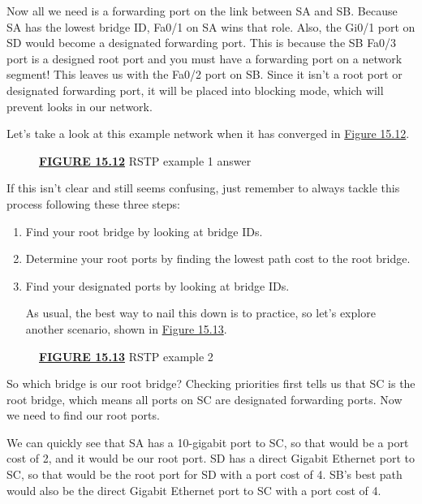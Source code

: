 \documentclass[b5paper,11pt]{memoir}
\begin{document}
Now all we need is a forwarding port on the link between SA and SB.
Because SA has the lowest bridge ID, Fa0/1 on SA wins that role. Also,
the Gi0/1 port on SD would become a designated forwarding port. This is
because the SB Fa0/3 port is a designed root port and you must have a
forwarding port on a network segment! This leaves us with the Fa0/2 port
on SB. Since it isn't a root port or designated forwarding port, it will
be placed into blocking mode, which will prevent looks in our network.

Let's take a look at this example network when it has converged in
\protect\hyperlink{c15.xhtmlux5cux23figure15-12}{Figure 15.12}.

\begin{figure}
\centering
\caption{{\protect\hyperlink{c15.xhtmlux5cux23figureanchor15-12}{\textbf{FIGURE
15.12}} RSTP example 1 answer}}
\end{figure}

If this isn't clear and still seems confusing, just remember to always
tackle this process following these three steps:

\begin{enumerate}
\item
  Find your root bridge by looking at bridge IDs.
\item
  Determine your root ports by finding the lowest path cost to the root
  bridge.
\item
  Find your designated ports by looking at bridge IDs.

  As usual, the best way to nail this down is to practice, so let's
  explore another scenario, shown in
  \protect\hyperlink{c15.xhtmlux5cux23figure15-13}{Figure 15.13}.
\end{enumerate}



\begin{figure}
\centering
\caption{{\protect\hyperlink{c15.xhtmlux5cux23figureanchor15-13}{\textbf{FIGURE
15.13}} RSTP example 2}}
\end{figure}

So which bridge is our root bridge? Checking priorities first tells us
that SC is the root bridge, which means all ports on SC are designated
forwarding ports. Now we need to find our root ports.

We can quickly see that SA has a 10-gigabit port to SC, so that would be
a port cost of 2, and it would be our root port. SD has a direct Gigabit
Ethernet port to SC, so that would be the root port for SD with a port
cost of 4. SB's best path would also be the direct Gigabit Ethernet port
to SC with a port cost of 4.
\end{document}
